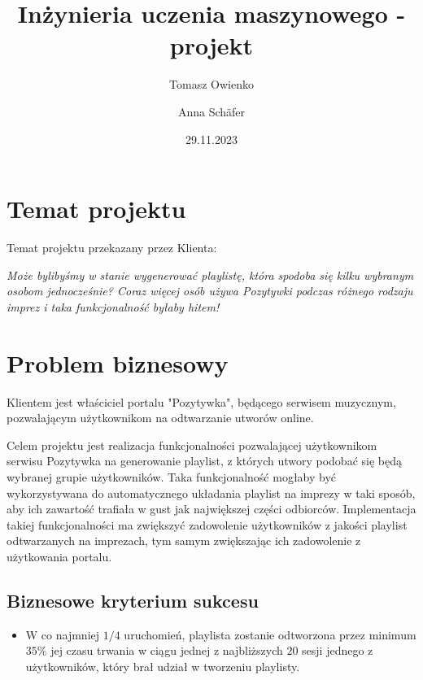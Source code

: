 \documentclass[10pt,a4paper]{article}
\title{Inżynieria uczenia maszynowego - projekt}
\author{Tomasz Owienko \and Anna Schäfer}
\date{29.11.2023}
\begin{document}
\maketitle

\section{Temat projektu}




Temat projektu przekazany przez Klienta:

\begin{displayquote}
	\textit{Może bylibyśmy w stanie wygenerować playlistę, która spodoba się kilku wybranym osobom jednocześnie? Coraz więcej osób używa Pozytywki podczas różnego rodzaju imprez i taka funkcjonalność byłaby hitem!}
\end{displayquote}


\section{Problem biznesowy}

Klientem jest właściciel portalu "Pozytywka", będącego serwisem muzycznym, pozwalającym użytkownikom na odtwarzanie utworów online.

Celem projektu jest realizacja funkcjonalności pozwalającej użytkownikom serwisu Pozytywka na generowanie playlist, z których utwory podobać się będą wybranej grupie użytkowników. Taka funkcjonalność mogłaby być wykorzystywana do automatycznego układania playlist na imprezy w taki sposób, aby ich zawartość trafiała w gust jak największej części odbiorców. Implementacja takiej funkcjonalności ma zwiększyć zadowolenie użytkowników z jakości playlist odtwarzanych na imprezach, tym samym zwiększając ich zadowolenie z użytkowania portalu.

\subsection*{Biznesowe kryterium sukcesu}
\begin{itemize}
\item W co najmniej $1/4$ uruchomień, playlista zostanie odtworzona przez minimum $35\%$ jej czasu trwania w ciągu jednej z najbliższych $20$ sesji jednego z użytkowników, który brał udział w tworzeniu playlisty.
\end{itemize}
\end{document}
